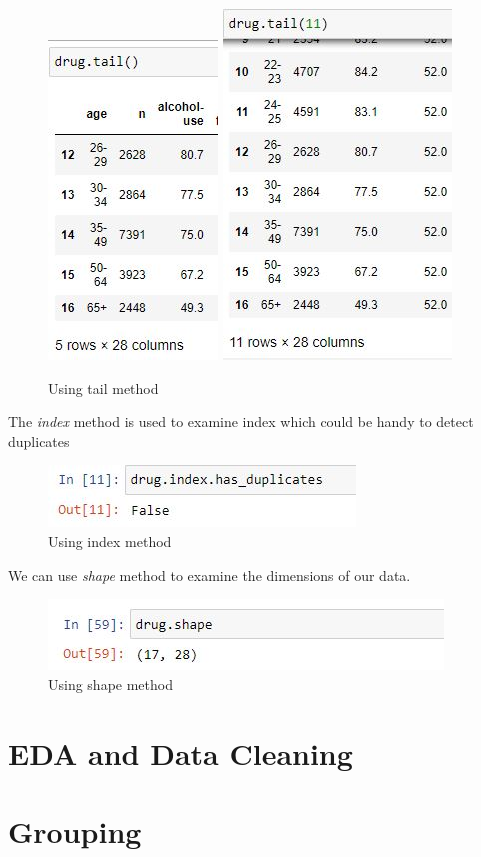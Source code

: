 \begin{figure}[ht]
	\centering
	\includegraphics{Assets/Images/Pandas/tail}
	\includegraphics{Assets/Images/Pandas/tail11}
	\caption{Using tail method}
	\label{fig:tail}
\end{figure}

\newpage
\noindent The \textit{index} method is used to examine index which could be handy to detect duplicates

\begin{figure}[ht]
	\centering
	\includegraphics{Assets/Images/Pandas/index_duplicates}
	\caption{Using index method}
	\label{fig:index}
\end{figure}

\noindent We can use \textit{shape} method to examine the dimensions of our data.

\begin{figure}[ht]
	\centering
	\includegraphics{Assets/Images/Pandas/shape}
	\caption{Using shape method}
	\label{fig:index}
\end{figure}
\section{EDA and Data Cleaning}
\section{Grouping}